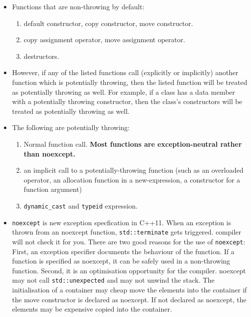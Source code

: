\documentclass[a4paper,11pt,twoside]{book}
\begin{document}
\begin{itemize}
    \item Functions that are non-throwing by default:
        \begin{enumerate}
            \item default constructor, copy constructor, move constructor.
            \item copy assignment operator, move assignment operator.
            \item destructors.
        \end{enumerate}

    \item However, if any of the listed functions call (explicitly or implicitly) another function which is potentially throwing, then the listed function will be treated as potentially throwing as well. For example, if a class has a data member with a potentially throwing constructor, then the class’s constructors will be treated as potentially throwing as well. 
    
    \item The following are potentially throwing:
        \begin{enumerate}
            \item Normal function call. \textbf{Most functions are exception-neutral rather than noexcept.}
            \item an implicit call to a potentially-throwing function (such as an overloaded operator, an allocation function in a new-expression, a constructor for a function argument)
            \item \texttt{dynamic\_cast} and \texttt{typeid} expression.
        \end{enumerate}

    \item \texttt{noexcept} is new exception specfication in C++11. When an exception is thrown from an noexcept function, \texttt{std::terminate} gets triggered. compiler will not check it for you. There are two good reasons for the use of \texttt{noexcept}: First, an exception specifier documents the behaviour of the function. If a function is specified as noexcept, it can be safely used in a non-throwing function. Second, it is an optimisation opportunity for the compiler. noexcept may not call \texttt{std::unexpected} and may not unwind the stack. The initialisation of a container may cheap move the elements into the container if the move constructor is declared as noexcept. If not declared as noexcept, the elements may be expensive copied into the container.


\end{itemize}
\end{document}
